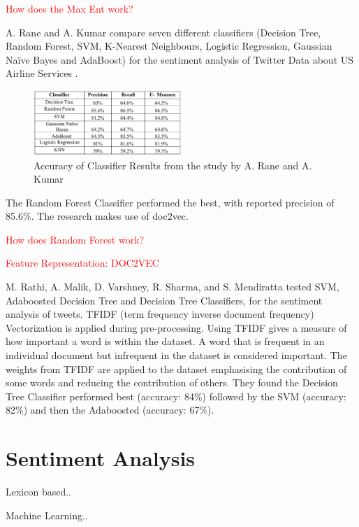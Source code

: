 \textcolor{red}{How does the Max Ent work?}

A. Rane and A. Kumar compare seven different classifiers (Decision Tree, Random Forest, SVM, K-Nearest Neighbours, Logistic Regression, Gaussian Naïve Bayes and AdaBoost) for the sentiment analysis of Twitter Data about US Airline Services \cite{Rane2018}. 
\begin{figure}
    \centering
    \includegraphics[width=0.5\textwidth]{literature_review/arane_classifier_results.PNG}
    \caption{Accuracy of Classifier Results from the study by A. Rane and A. Kumar \cite{Rane2018}}
\end{figure}
The Random Forest Classifier performed the best, with reported precision of 85.6\%. The research makes use of doc2vec.

\textcolor{red}{How does Random Forest work?}

\textcolor{red}{Feature Representation: DOC2VEC}

M. Rathi, A. Malik, D. Varshney, R. Sharma, and S. Mendiratta \cite{Raithi2018} tested SVM, Adaboosted Decision Tree and Decision Tree Classifiers, for the sentiment analysis of tweets. TFIDF (term frequency inverse document frequency) Vectorization is applied during pre-processing. Using TFIDF gives a measure of how important a word is within the dataset. A word that is frequent in an individual document but infrequent in the dataset is considered important. The weights from TFIDF are applied to the dataset emphasising the contribution of some words and reducing the contribution of others. They found the Decision Tree Classifier performed best  (accuracy: 84\%) followed by the SVM (accuracy: 82\%) and then the Adaboosted (accuracy: 67\%). 



\section{Sentiment Analysis}

Lexicon based..

Machine Learning..

